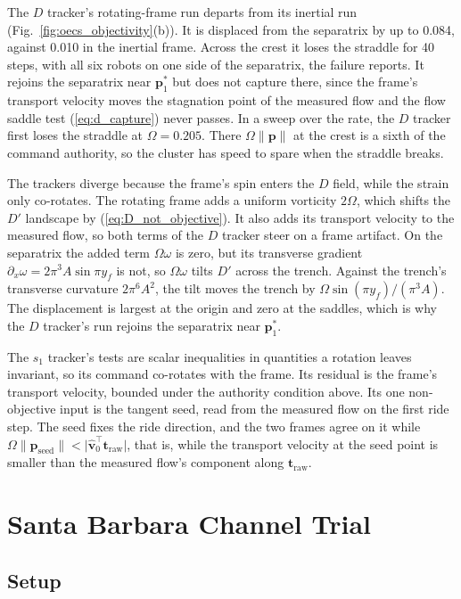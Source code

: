 \documentclass[lettersize,journal]{IEEEtran}
\begin{document}
The $D$ tracker's rotating-frame run departs from its inertial run
(Fig.~\ref{fig:oecs_objectivity}(b)). It is displaced from the separatrix
by up to 0.084, against 0.010 in the inertial frame. Across the crest it
loses the straddle for 40 steps, with all six robots on one side of the
separatrix, the failure \cite{26} reports. It rejoins the separatrix near
$\mathbf{p}_1^*$ but does not capture there, since the frame's transport
velocity moves the stagnation point of the measured flow and the flow
saddle test (\ref{eq:d_capture}) never passes. In a sweep over the rate,
the $D$ tracker first loses the straddle at $\Omega = 0.205$. There
$\Omega\lVert\mathbf{p}\rVert$ at
the crest is a sixth of the command authority, so the cluster has speed to
spare when the straddle breaks.

The trackers diverge because the frame's spin enters the $D$ field, while
the strain only co-rotates. The rotating frame adds a uniform vorticity $2\Omega$, which
shifts the $D'$ landscape by (\ref{eq:D_not_objective}). It also adds its
transport velocity to the measured flow, so both terms of the $D$ tracker
steer on a frame artifact. On the separatrix the added term
$\Omega\omega$ is zero, but its transverse gradient
$\partial_x\omega = 2\pi^3 A\sin\pi y_f$ is not, so $\Omega\omega$ tilts
$D'$ across the trench. Against the trench's transverse curvature
$2\pi^6 A^2$, the tilt moves the trench by
$\Omega\sin(\pi y_f)/(\pi^3 A)$. The displacement is largest at the origin
and zero at the saddles, which is why the $D$ tracker's run rejoins the
separatrix near $\mathbf{p}_1^*$.

The $s_1$ tracker's tests are scalar inequalities in quantities a rotation
leaves invariant, so its command co-rotates with the frame. Its residual is
the frame's transport velocity, bounded under the authority condition above. Its one non-objective input is the tangent
seed, read from the measured flow on the first ride step. The seed fixes
the ride direction, and the two frames agree on it while
$\Omega\lVert\mathbf{p}_{\text{seed}}\rVert <
\lvert\hat{\mathbf{v}}_0^\top\mathbf{t}_{\text{raw}}\rvert$, that is, while
the transport velocity at the seed point is smaller than the measured
flow's component along $\mathbf{t}_{\text{raw}}$.

\section{Santa Barbara Channel Trial}
\label{sec:ocean}

\subsection{Setup}
\label{sec:ocean_sim}
\end{document}
